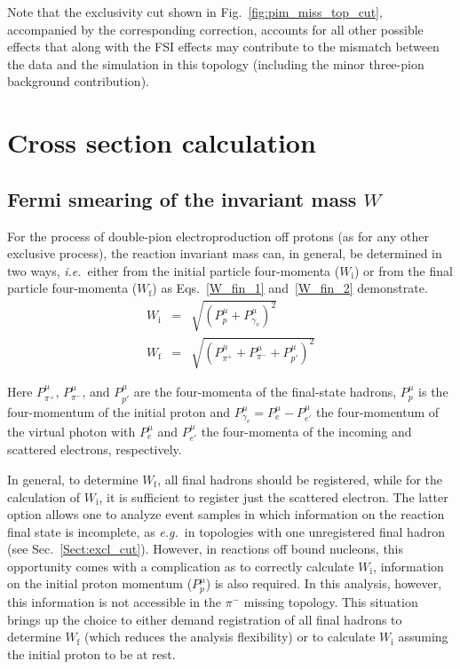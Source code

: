 \documentclass[prc,twocolumn,superscriptaddress,showpacs,amssymb,amsmath,amsfonts,aps,nofootinbib]{revtex4-1}
\begin{document}
Note that the exclusivity cut shown in Fig.\!~\ref{fig:pim_miss_top_cut}, accompanied by the corresponding correction, accounts for all other possible effects that along with the FSI effects may contribute to the mismatch between the data and the simulation in this topology (including the minor three-pion background contribution).


\section{Cross section calculation}

\subsection{Fermi smearing of the invariant mass $W$}
\label{Sect:smearing_blurring}


For the process of double-pion electroproduction off protons (as for any other exclusive process), the reaction invariant mass can, in general, be determined in two ways, {\it i.e.}~either from the initial particle  four-momenta ($W_{\text{i}}$) or from the final particle  four-momenta ($W_{\text{f}}$) as Eqs.\!~\eqref{W_fin_1} and~\eqref{W_fin_2} demonstrate. 
\begin{eqnarray}
W_{\text{i}}&= & \sqrt{(P_{p}^{\mu}+P_{\gamma_{v}}^{\mu})^{2}} \label{W_fin_1} \\
W_{\text{f}}&= & \sqrt{(P_{\pi^{+}}^{\mu}+P_{\pi^{-}}^{\mu}+P_{p'}^{\mu})^{2}} \label{W_fin_2}
\end{eqnarray}

Here $P_{\pi^{+}}^{\mu}$, $P_{\pi^{-}}^{\mu}$, and $P_{p'}^{\mu}$ are the four-momenta of the final-state hadrons, $P_{p}^{\mu}$ is the four-momentum of the initial proton and $P_{\gamma_{v}}^{\mu}=P_{e}^{\mu}-P_{e'}^{\mu}$ the four-momentum of the virtual photon with $P_{e}^{\mu}$ and $P_{e'}^{\mu}$ the four-momenta of the incoming and scattered electrons, respectively. 

In general, to determine $W_{\text{f}}$, all final hadrons should be registered, while for the calculation of $W_{\text{i}}$, it is sufficient to register just the scattered electron. The latter option allows one to analyze event samples in which information on the reaction final state is incomplete, as {\it e.g.}~in topologies with one unregistered final hadron (see Sec.\!~\ref{Sect:excl_cut}). However, in reactions off bound nucleons, this opportunity comes with a complication as to correctly calculate $W_{\text{i}}$, information on the initial proton momentum ($P_{p}^{\mu}$) is also required. In this analysis, however, this information is not accessible in the $\pi^{-}$ missing topology. This situation brings up the choice to either demand registration of all final hadrons to determine $W_{\text{f}}$ (which reduces the analysis flexibility) or to calculate $W_{\text{i}}$ assuming the initial proton to be at rest.  
\end{document}
